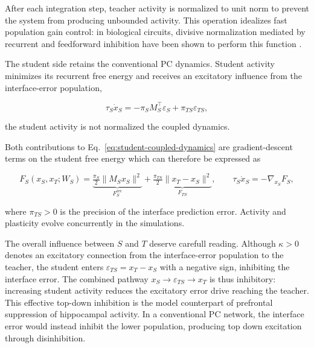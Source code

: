 \documentclass[10pt,letterpaper]{article}
\theoremstyle{plain}
\theoremstyle{remark}
\begin{document}
After each integration step, teacher activity is normalized to unit norm to prevent the system from producing unbounded activity. This operation idealizes fast population gain control: in biological circuits, divisive normalization mediated by recurrent and feedforward inhibition have been shown to perform this function \cite{REF}.


The student side retains the conventional PC dynamics. Student activity minimizes its recurrent free energy and receives an excitatory influence from the interface-error population,

\begin{equation}
\tau_S\dot x_S
=
-\pi_SM_S^\top\varepsilon_S
+\pi_{TS}\varepsilon_{TS},
\label{eq:student-coupled-dynamics}
\end{equation}

the student activity is not normalized the coupled dynamics.

Both contributions to Eq.~\eqref{eq:student-coupled-dynamics} are gradient-descent terms on the student free energy which can therefore be expressed as 

\begin{equation}
F_S(x_S,x_T;W_S)
=
\underbrace{\tfrac{\pi_S}{2}\|M_Sx_S\|^2}_{F_S^{\mathrm{rec}}}
+
\underbrace{\tfrac{\pi_{TS}}{2}\|x_T-x_S\|^2}_{F_{TS}},
\qquad
\tau_S\dot x_S=-\nabla_{x_S}F_S,
\label{eq:student-energy}
\end{equation}

where $\pi_{TS}>0$ is the precision of the interface prediction error.
Activity and plasticity evolve concurrently in the simulations.

The overall influence between $S$ and $T$ deserve carefull reading. Although $\kappa>0$ denotes an excitatory connection from the interface-error population to the teacher, the student enters $\varepsilon_{TS}=x_T-x_S$ with a negative sign, inhibiting the interface error. The combined pathway $x_S\rightarrow\varepsilon_{TS}\rightarrow x_T$ is thus inhibitory: increasing student activity reduces the excitatory error drive reaching the teacher. This effective top-down inhibition is the model counterpart of prefrontal suppression of hippocampal activity. In a conventional PC network, the interface error would instead inhibit the lower population, producing top down excitation through disinhibition.

\end{document}

